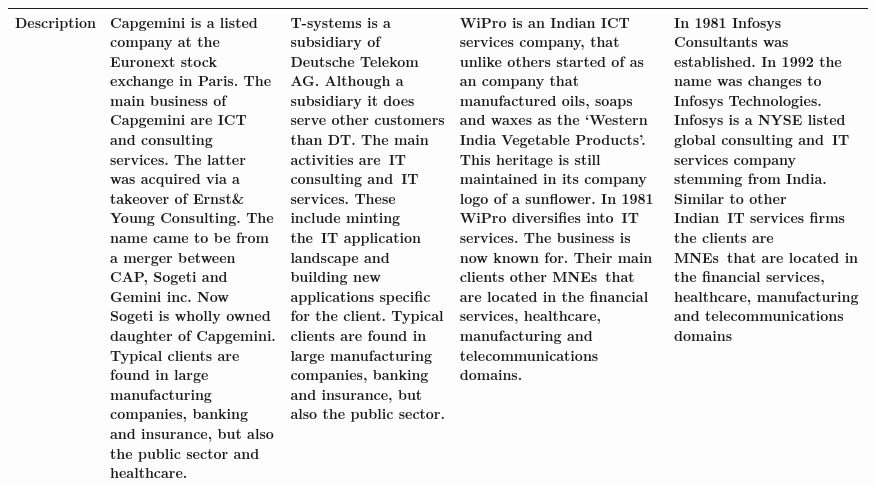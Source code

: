 \begin{sidewaystable}
\begin{tabular}{lp{4cm}p{4cm}p{4cm}p{4cm}}
 \midrule
 \textbf{Description} &
  
Capgemini is a listed company at the Euronext stock exchange in Paris. The  main business of Capgemini are ICT and consulting services. The latter was acquired via a takeover of Ernst\& Young Consulting. \newline The name came to be from a merger between CAP, Sogeti and Gemini inc. Now Sogeti is wholly owned daughter of Capgemini. Typical clients are found in large manufacturing companies, banking and insurance, but also the public sector and healthcare.  &

 T-systems is a subsidiary of Deutsche Telekom AG\@. 
 Although a subsidiary it does serve other customers than DT\@. 
 The main activities are~\gls{IT} consulting and~\gls{IT} services. 
 These include minting the~\gls{IT} application landscape and building new applications specific for the client. 
 Typical clients are found in large manufacturing companies, banking and insurance, but also the public sector. &
 
WiPro is an Indian ICT services company, that unlike others started of as an company that manufactured oils, soaps and waxes as the `Western India Vegetable Products'.
 This heritage is still maintained in its company logo of a sunflower. 
In 1981 WiPro diversifies into~\gls{IT} services. The business is now known for. \newline 
Their main clients other \glspl{MNE}~that are located in the financial services, healthcare, manufacturing and telecommunications domains. &
In 1981 Infosys Consultants was established. In 1992 the name was changes to Infosys Technologies. Infosys is a NYSE listed global consulting and~\gls{IT} services company stemming from India. 
Similar to other Indian~\gls{IT} services firms the clients are \glspl{MNE}~that are located in the financial services, healthcare, manufacturing and telecommunications domains \\
  \bottomrule 
  \end{tabular}
\end{sidewaystable}
